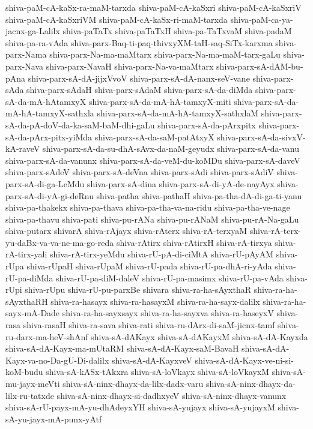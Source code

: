 {shiva-paM-cA-kaSx-ra-maM-tarxda
shiva-paM-cA-kaSxri
shiva-paM-cA-kaSxriV
shiva-paM-cA-kaSxriVM
shiva-paM-cA-kaSx-ri-maM-tarxda
shiva-paM-ca-ya-jacnx-ga-Lalilx
shiva-paTaTx
shiva-paTaTxH
shiva-pa-TaTxvaM
shiva-padaM
shiva-pa-ra-vAda
shiva-parx-Baq-ti-paq-thivxyXM-taH-saq-SiTx-karxma
shiva-parx-Nama
shiva-parx-Na-ma-maMtarx
shiva-parx-Na-ma-maM-tarx-gaLu
shiva-parx-Nava
shiva-parx-NavaH
shiva-parx-Na-va-maMtarx
shiva-parx-sA-dAM-bu-pAna
shiva-parx-sA-dA-jijxVvoV
shiva-parx-sA-dA-nanx-seV-vane
shiva-parx-sAda
shiva-parx-sAdaH
shiva-parx-sAdaM
shiva-parx-sA-da-diMda
shiva-parx-sA-da-mA-hAtamxyX
shiva-parx-sA-da-mA-hA-tamxyX-miti
shiva-parx-sA-da-mA-hA-tamxyX-sathxla
shiva-parx-sA-da-mA-hA-tamxyX-sathxlaM
shiva-parx-sA-da-pA-doV-da-ka-saM-baM-dhi-gaLu
shiva-parx-sA-da-pArxpitx
shiva-parx-sA-da-pArx-pitx-yiMda
shiva-parx-sA-da-saM-patAtxyX
shiva-parx-sA-da-sivxV-kA-raveV
shiva-parx-sA-da-su-dhA-sAvx-da-naM-geyudx
shiva-parx-sA-da-vanu
shiva-parx-sA-da-vanunx
shiva-parx-sA-da-veM-du-koMDu
shiva-parx-sA-daveV
shiva-parx-sAdeV
shiva-parx-sA-deVna
shiva-parx-sAdi
shiva-parx-sAdiV
shiva-parx-sA-di-ga-LeMdu
shiva-parx-sA-dina
shiva-parx-sA-di-yA-de-nayAyx
shiva-parx-sA-di-yA-gi-deRnu
shiva-patha
shiva-pathaH
shiva-pa-tha-dA-di-ga-ti-yanu
shiva-pa-thakekx
shiva-pa-thava
shiva-pa-tha-va-na-ridu
shiva-pa-tha-ve-nage
shiva-pa-thavu
shiva-pati
shiva-pu-rANa
shiva-pu-rANaM
shiva-pu-rA-Na-gaLu
shiva-putarx
shivarA
shiva-rAjayx
shiva-rAterx
shiva-rA-terxyaM
shiva-rA-terx-yu-daBx-va-va-ne-ma-go-reda
shiva-rAtirx
shiva-rAtirxH
shiva-rA-tirxya
shiva-rA-tirx-yali
shiva-rA-tirx-yeMdu
shiva-rU-pA-di-ciMtA
shiva-rU-pAyAM
shiva-rUpa
shiva-rUpaH
shiva-rUpaM
shiva-rU-pada
shiva-rU-pa-dhA-ri-yAda
shiva-rU-pa-diMda
shiva-rU-pa-diM-daleV
shiva-rU-pa-masimx
shiva-rU-pa-vAda
shiva-rUpi
shiva-rUpu
shiva-rU-pu-parxBe
shivara
shiva-ra-ha-sAyxthaR
shiva-ra-ha-sAyxthaRH
shiva-ra-hasayx
shiva-ra-hasayxM
shiva-ra-ha-sayx-dalilx
shiva-ra-ha-sayx-mA-Dade
shiva-ra-ha-sayxsayx
shiva-ra-ha-sayxva
shiva-ra-haseyxV
shiva-rasa
shiva-rasaH
shiva-ra-sava
shiva-rati
shiva-ru-dArx-di-saM-jicnx-tamf
shiva-ru-darx-ma-heV-shAnf
shiva-sA-dAKayx
shiva-sA-dAKayxM
shiva-sA-dA-Kayxda
shiva-sA-dA-Kayx-ma-mUtaRM
shiva-sA-dA-Kayx-saM-BavaH
shiva-sA-dA-Kayx-va-no-Da-gU-Di-dalilx
shiva-sA-dA-KayxveV
shiva-sA-dA-Kayx-ve-ni-si-koM-budu
shiva-sA-kASx-tAkxra
shiva-sA-loVkayx
shiva-sA-loVkayxM
shiva-sA-mu-jayx-meVti
shiva-sA-ninx-dhayx-da-lilx-dadx-varu
shiva-sA-ninx-dhayx-da-lilx-ru-tatxde
shiva-sA-ninx-dhayx-si-dadhxyeV
shiva-sA-ninx-dhayx-vanunx
shiva-sA-rU-payx-mA-yu-dhAdeyxYH
shiva-sA-yujayx
shiva-sA-yujayxM
shiva-sA-yu-jayx-mA-punx-yAtf
}
